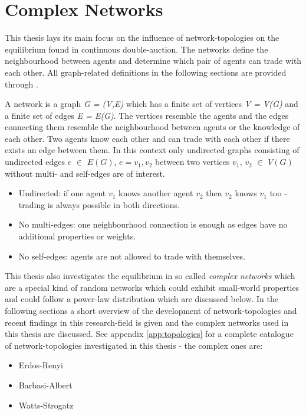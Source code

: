 \documentclass[../Bachelorarbeit.tex]{subfiles}
\begin{document}
\graphicspath{{./figures/theory/nw/}}	%

\section{Complex Networks}
\label{sec:theory_complexNetworks}
This thesis lays its main focus on the influence of network-topologies on the equilibrium found in continuous double-auction. The networks define the neighbourhood between agents and determine which pair of agents can trade with each other. All graph-related definitions in the following sections are provided through \cite{Drmota2007}.

\medskip

A network is a graph \textit{G = (V,E)} which has a finite set of vertices \textit{V = V(G)} and a finite set of edges \textit{E = E(G)}. The vertices resemble the agents and the edges connecting them resemble the neighbourhood between agents or the knowledge of each other. Two agents know each other and can trade with each other if there exists an edge between them. In this context only undirected graphs consisting of undirected edges $e$ $\in$ $E(G)$, $e = {v_1, v_2}$ between two vertices $v_1$, $v_2$ $\in$ $V(G)$ without multi- and self-edges are of interest.

\begin{itemize}
\item Undirected: if one agent $v_1$ knows another agent $v_2$ then $v_2$ knows $v_1$ too - trading is always possible in both directions.
\item No multi-edges: one neighbourhood connection is enough as edges have no additional properties or weights.
\item No self-edges: agents are not allowed to trade with themselves.
\end{itemize}

This thesis also investigates the equilibrium in so called \textit{complex networks} which are a special kind of random networks which could exhibit small-world properties and could follow a power-law distribution which are discussed below. In the following sections a short overview of the development of network-topologies and recent findings in this research-field is given and the complex networks used in this thesis are discussed. See appendix \ref{app:topologies} for a complete catalogue of network-topologies investigated in this thesis - the complex ones are:

\begin{itemize}
\item Erdos-Renyi
\item Barbasi-Albert
\item Watts-Strogatz
\end{itemize}
\end{document}
